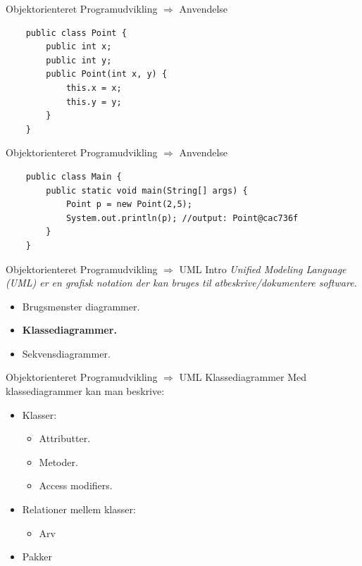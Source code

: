 \documentclass[10pt,aspectratio=1610]{beamer}
\begin{document}
\begin{frame}[fragile]{Objektorienteret Programudvikling $\Rightarrow$ Anvendelse}
\begin{lstlisting}
    public class Point {
        public int x;
        public int y;
        public Point(int x, y) {
            this.x = x;
            this.y = y;
        }
    }
\end{lstlisting}

\end{frame}

\begin{frame}[fragile]{Objektorienteret Programudvikling $\Rightarrow$ Anvendelse}
\begin{lstlisting}
    public class Main {
        public static void main(String[] args) {
            Point p = new Point(2,5);
            System.out.println(p); //output: Point@cac736f
        }
    }
\end{lstlisting}
\end{frame}


\begin{frame}{Objektorienteret Programudvikling $\Rightarrow$ UML Intro}
    \textit{Unified Modeling Language (UML) er en grafisk notation der kan bruges til atbeskrive/dokumentere software.}
    \vspace{0.5cm}
    \begin{itemize}
        \item Brugsmønster diagrammer.
        \item \textbf{Klassediagrammer.}
        \item Sekvensdiagrammer.
    \end{itemize}
\end{frame}


\begin{frame}{Objektorienteret Programudvikling $\Rightarrow$ UML Klassediagrammer}
    Med klassediagrammer kan man beskrive:
    \begin{itemize}
        \item Klasser:
        \begin{itemize}
            \item Attributter.
            \item Metoder.
            \item Access modifiers.
        \end{itemize}
        \item Relationer mellem klasser:
        \begin{itemize}
            \item Arv
        \end{itemize}
        \item Pakker
    \end{itemize}
\end{frame}
\end{document}
